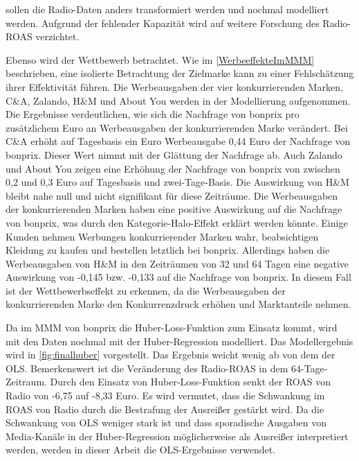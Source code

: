 sollen die Radio-Daten anders transformiert werden und nochmal modelliert werden. Aufgrund der fehlender Kapazität wird auf weitere Forschung des Radio-\ac{ROAS} verzichtet. \par
Ebenso wird der Wettbewerb betrachtet. Wie im \autoref{WerbeeffekteImMMM} beschrieben, eine isolierte Betrachtung der Zielmarke kann zu einer Fehlschätzung ihrer Effektivität führen. Die Werbeausgaben der vier konkurrierenden Marken, C\&A, Zalando, H\&M und About You werden in der Modellierung aufgenommen. Die Ergebnisse verdeutlichen, wie sich die Nachfrage von bonprix pro zusätzlichem Euro an Werbeausgaben der konkurrierenden Marke verändert. Bei C\&A erhöht auf Tagesbasis ein Euro Werbeausgabe 0,44 Euro der Nachfrage von bonprix. Dieser Wert nimmt mit der Glättung der Nachfrage ab. Auch Zalando und About You zeigen eine Erhöhung der Nachfrage von bonprix von zwischen 0,2 und 0,3 Euro auf Tagesbasis und zwei-Tage-Basis. Die Auswirkung von H\&M bleibt nahe null und nicht signifikant für diese Zeiträume. Die Werbeausgaben der konkurrierenden Marken haben eine positive Auswirkung auf die Nachfrage von bonprix, was durch den Kategorie-Halo-Effekt erklärt werden könnte. Einige Kunden nehmen Werbungen konkurrierender Marken wahr, beabsichtigen Kleidung zu kaufen und bestellen letztlich bei bonprix. 
Allerdings haben die Werbeausgaben von H\&M in den Zeiträumen von 32 und 64 Tagen eine negative Auswirkung von -0,145 bzw. -0,133 auf die Nachfrage von bonprix. In diesem Fall ist der Wettbewerbseffekt zu erkennen, da die Werbeausgaben der konkurrierenden Marke den Konkurrenzdruck erhöhen und Marktanteile nehmen. \par
Da im \ac{MMM} von bonprix die Huber-Loss-Funktion zum Einsatz kommt, wird mit den Daten nochmal mit der Huber-Regression modelliert. Das Modellergebnis wird in \autoref{fig:finalhuber} vorgestellt. Das Ergebnis weicht wenig ab von dem der \ac{OLS}. Bemerkenswert ist die Veränderung des Radio-\ac{ROAS} in dem 64-Tage-Zeitraum. Durch den Einsatz von Huber-Loss-Funktion senkt der \ac{ROAS} von Radio von -6,75 auf -8,33 Euro. Es wird vermutet, dass die Schwankung im \ac{ROAS} von Radio durch die Bestrafung der Ausreißer gestärkt wird. Da die Schwankung von \ac{OLS} weniger stark ist und dass sporadische Ausgaben von Media-Kanäle in der Huber-Regression möglicherweise als Ausreißer interpretiert werden, werden in dieser Arbeit die \ac{OLS}-Ergebnisse verwendet. 
